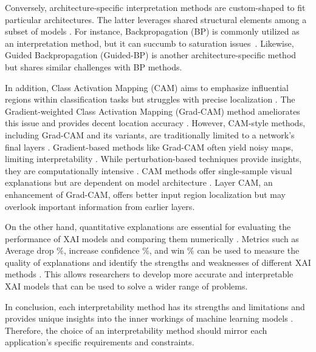 Conversely, architecture-specific interpretation methods are custom-shaped to fit particular architectures. The latter leverages shared structural elements among a subset of models \cite{selvaraju2017grad}. For instance, Backpropagation (BP) \cite{apicella2022toward} is commonly utilized as an interpretation method, but it can succumb to saturation issues~\cite{sujatha2023empirical}. Likewise, Guided Backpropagation (Guided-BP) \cite{tjoa2022evaluating} is another architecture-specific method but shares similar challenges with BP methods.

In addition, Class Activation Mapping (CAM) \cite{tjoa2020survey} aims to emphasize influential regions within classification tasks but struggles with precise localization \cite{lin2021you}. The Gradient-weighted Class Activation Mapping (Grad-CAM) method \cite{vaquerizo2023explainable} ameliorates this issue and provides decent location accuracy \cite{chaddad2023survey, nunnari2021overlap}. However, CAM-style methods, including Grad-CAM and its variants, are traditionally limited to a network's final layers \cite{jiang2021layercam, selvaraju2017grad, chattopadhay2018grad}. Gradient-based methods like Grad-CAM often yield noisy maps, limiting interpretability \cite{omeiza2019smooth}. While perturbation-based techniques provide insights, they are computationally intensive \cite{fong2017interpretable}. CAM methods offer single-sample visual explanations but are dependent on model architecture \cite{wang2020score}. Layer CAM, an enhancement of Grad-CAM, offers better input region localization but may overlook important information from earlier layers. \cite{jiang2021layercam}

On the other hand, quantitative explanations are essential for evaluating the performance of XAI models and comparing them numerically \cite{hassija2023interpreting}. Metrics such as Average drop $\%$, increase confidence $\%$, and win $\%$ can be used to measure the quality of explanations and identify the strengths and weaknesses of different XAI methods \cite{naidu2020cam}. This allows researchers to develop more accurate and interpretable XAI models that can be used to solve a wider range of problems.

In conclusion, each interpretability method has its strengths and limitations and provides unique insights into the inner workings of machine learning models \cite{rahate2022multimodal}. Therefore, the choice of an interpretability method should mirror each application's specific requirements and constraints.

